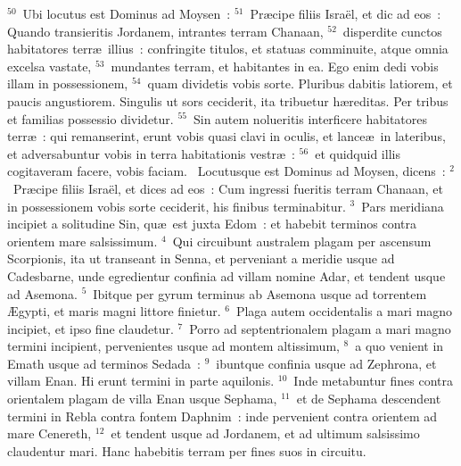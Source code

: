 ${}^{50}$~Ubi locutus est Dominus ad Moysen~:
${}^{51}$~Pr\ae cipe filiis Isra\"el, et dic ad eos~: Quando transieritis Jordanem, intrantes terram Chanaan,
${}^{52}$~disperdite cunctos habitatores terr\ae\ illius~: confringite titulos, et statuas comminuite, atque omnia excelsa vastate,
${}^{53}$~mundantes terram, et habitantes in ea. Ego enim dedi vobis illam in possessionem,
${}^{54}$~quam dividetis vobis sorte. Pluribus dabitis latiorem, et paucis angustiorem. Singulis ut sors ceciderit, ita tribuetur h\ae reditas. Per tribus et familias possessio dividetur.
${}^{55}$~Sin autem nolueritis interficere habitatores terr\ae~: qui remanserint, erunt vobis quasi clavi in oculis, et lance\ae\ in lateribus, et adversabuntur vobis in terra habitationis vestr\ae~:
${}^{56}$~et quidquid illis cogitaveram facere, vobis faciam.
~\lettrine[lines=10,image=true,loversize=0.05,lraise=-0.03]{L}{}ocutusque est Dominus ad Moysen, dicens~:
${}^{2}$~Pr\ae cipe filiis Isra\"el, et dices ad eos~: Cum ingressi fueritis terram Chanaan, et in possessionem vobis sorte ceciderit, his finibus terminabitur.
${}^{3}$~Pars meridiana incipiet a solitudine Sin, qu\ae\ est juxta Edom~: et habebit terminos contra orientem mare salsissimum.
${}^{4}$~Qui circuibunt australem plagam per ascensum Scorpionis, ita ut transeant in Senna, et perveniant a meridie usque ad Cadesbarne, unde egredientur confinia ad villam nomine Adar, et tendent usque ad Asemona.
${}^{5}$~Ibitque per gyrum terminus ab Asemona usque ad torrentem \AE gypti, et maris magni littore finietur.
${}^{6}$~Plaga autem occidentalis a mari magno incipiet, et ipso fine claudetur.
${}^{7}$~Porro ad septentrionalem plagam a mari magno termini incipient, pervenientes usque ad montem altissimum,
${}^{8}$~a quo venient in Emath usque ad terminos Sedada~:
${}^{9}$~ibuntque confinia usque ad Zephrona, et villam Enan. Hi erunt termini in parte aquilonis.
${}^{10}$~Inde metabuntur fines contra orientalem plagam de villa Enan usque Sephama,
${}^{11}$~et de Sephama descendent termini in Rebla contra fontem Daphnim~: inde pervenient contra orientem ad mare Cenereth,
${}^{12}$~et tendent usque ad Jordanem, et ad ultimum salsissimo claudentur mari. Hanc habebitis terram per fines suos in circuitu.


